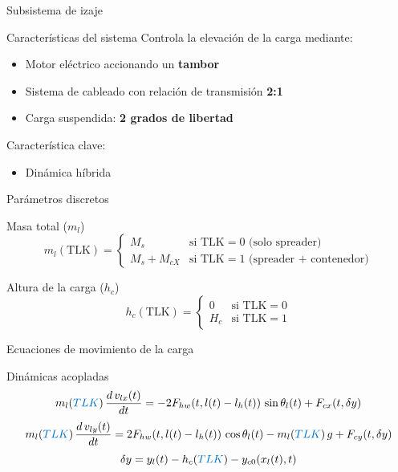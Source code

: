 \begin{frame}{Subsistema de izaje}
  \begin{block}{Características del sistema}
    Controla la elevación de la carga mediante:
    \begin{itemize}
      \item Motor eléctrico accionando un \textbf{tambor}
      \item Sistema de cableado con relación de transmisión \textbf{2:1}
      \item Carga suspendida: \textbf{2 grados de libertad}
    \end{itemize}
    Característica clave:
    \begin{itemize}
    \item\alert{Dinámica híbrida}
    \end{itemize}
  \end{block}
\end{frame}

\begin{frame}{Parámetros discretos}
  \begin{block}{Masa total ($m_l$)}
    \[
    m_l(\text{TLK}) = 
    \begin{cases} 
      M_s & \text{si TLK} = 0 \text{ (solo spreader)} \\[6pt]
      M_s + M_{cX} & \text{si TLK} = 1 \text{ (spreader + contenedor)}
    \end{cases}
    \]
  \end{block}

  \begin{block}{Altura de la carga ($h_c$)}
    \[
    h_c(\text{TLK}) = 
    \begin{cases} 
      0 & \text{si TLK} = 0 \\
      H_c & \text{si TLK} = 1
    \end{cases}
    \]
  \end{block}
\end{frame}

\begin{frame}{Ecuaciones de movimiento de la carga}
  \begin{block}{Dinámicas acopladas}
    \begin{equation*}
      m_l(\textcolor{signalcolor}{TLK}) \, \frac{d \, v_{lx}(t)}{dt} = -2 F_{hw}(t,l(t)-l_h(t)) \, \sin\theta_l(t) + F_{cx}(t, \delta y)
    \end{equation*}
    \begin{equation*}
        m_l(\textcolor{signalcolor}{TLK}) \, \frac{d \, v_{ly}(t)}{dt} = 2 F_{hw}(t,l(t)-l_h(t)) \, \cos\theta_l(t) - m_l(\textcolor{signalcolor}{TLK}) \, g + F_{cy}(t, \delta y)
    \end{equation*}
    \begin{equation*}
      \delta y = y_l(t) - h_c(\textcolor{signalcolor}{TLK}) - y_{c0}(x_l(t), t)
    \end{equation*}
  \end{block}
\end{frame}

